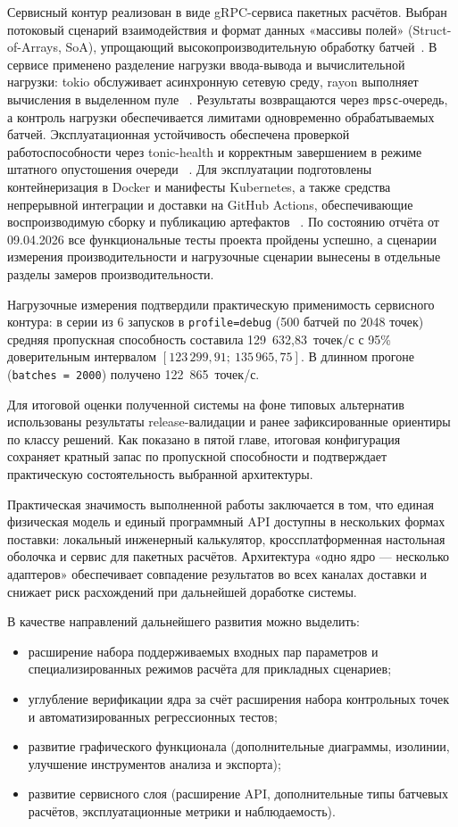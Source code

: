 Сервисный контур реализован в виде gRPC-сервиса пакетных расчётов.
Выбран потоковый сценарий взаимодействия и формат данных
«массивы полей» (Struct-of-Arrays, SoA),
упрощающий высокопроизводительную обработку батчей~\cite{grpc_docs}.
В сервисе применено разделение нагрузки ввода-вывода и вычислительной нагрузки:
tokio обслуживает асинхронную сетевую среду,
rayon выполняет вычисления в выделенном пуле
~\cite{tokio_spawn_blocking_docs,rayon_docs}.
Результаты возвращаются через \texttt{mpsc}-очередь,
а контроль нагрузки обеспечивается лимитами одновременно обрабатываемых батчей.
Эксплуатационная устойчивость обеспечена проверкой работоспособности через tonic-health
и корректным завершением в режиме штатного опустошения очереди
~\cite{tonic_health_docs}.
Для эксплуатации подготовлены контейнеризация в Docker и манифесты Kubernetes,
а также средства непрерывной интеграции и доставки на GitHub Actions,
обеспечивающие воспроизводимую сборку и публикацию артефактов
~\cite{docker_docs,kubernetes_docs,github_actions_docs}.
По состоянию отчёта 
от 09.04.2026
все функциональные тесты проекта пройдены успешно,
а сценарии измерения производительности и нагрузочные сценарии вынесены в отдельные разделы замеров производительности.

Нагрузочные измерения подтвердили практическую применимость сервисного контура:
в серии из 6 запусков 
в \texttt{profile=debug}
(500 батчей по 2048 точек)
средняя пропускная способность составила 129~632,83~точек/с
с 95\% доверительным интервалом
$[123\,299{,}91;\ 135\,965{,}75]$.
В длинном прогоне (\texttt{batches = 2000})
получено 122~865~точек/с.

Для итоговой оценки полученной системы на фоне типовых альтернатив
использованы результаты release-валидации и ранее зафиксированные ориентиры
по классу решений.
Как показано в пятой главе, итоговая конфигурация
сохраняет кратный запас по пропускной способности
и подтверждает практическую состоятельность выбранной архитектуры.

Практическая значимость выполненной работы заключается в том,
что единая физическая модель и единый программный API доступны
в нескольких формах поставки:
локальный инженерный калькулятор,
кроссплатформенная настольная оболочка
и сервис для пакетных расчётов.
Архитектура «одно ядро --- несколько адаптеров»
обеспечивает совпадение результатов во всех каналах доставки
и снижает риск расхождений при дальнейшей доработке системы.

В качестве направлений дальнейшего развития можно выделить:
\begin{itemize}
\item расширение набора поддерживаемых входных пар параметров и специализированных режимов расчёта для прикладных сценариев;
\item углубление верификации ядра за счёт расширения набора контрольных точек и автоматизированных регрессионных тестов;
\item развитие графического функционала (дополнительные диаграммы, изолинии, улучшение инструментов анализа и экспорта);
\item развитие сервисного слоя (расширение API, дополнительные типы батчевых расчётов, эксплуатационные метрики и наблюдаемость).
\end{itemize}
